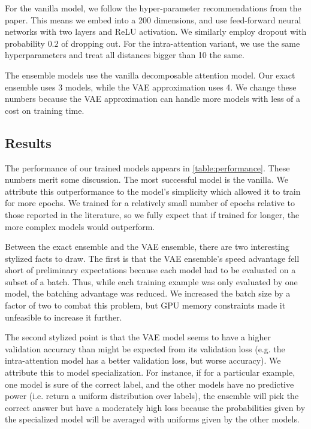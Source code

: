 \documentclass[12pt]{article}
\begin{document}
For the vanilla model, we follow the hyper-parameter recommendations from the
paper. This means we embed into a 200 dimensions, and use feed-forward neural
networks with two layers and ReLU activation. We similarly employ dropout with
probability $0.2$ of dropping out. For the intra-attention variant, we use the
same hyperparameters and treat all distances bigger than 10 the same.

The ensemble models use the vanilla decomposable attention model. Our exact
ensemble uses 3 models, while the VAE approximation uses 4. We change these
numbers because the VAE approximation can handle more models with less of a cost
on training time. 

\subsection{Results}

The performance of our trained models appears in \cref{table:performance}. These
numbers merit some discussion. The most successful model is the vanilla. We
attribute this outperformance to the model's simplicity which allowed it to
train for more epochs. We trained for a relatively small number of epochs
relative to those reported in the literature, so we fully expect that if trained
for longer, the more complex models would outperform.

Between the exact ensemble and the VAE ensemble, there are two interesting
stylized facts to draw. The first is that the VAE ensemble's speed advantage
fell short of preliminary expectations because each model had to be evaluated on
a subset of a batch. Thus, while each training example was only evaluated by one
model, the batching advantage was reduced. We increased the batch size by a
factor of two to combat this problem, but GPU memory constraints made it
unfeasible to increase it further.

The second stylized point is that the VAE model seems to have a higher
validation accuracy than might be expected from its validation loss (e.g. the
intra-attention model has a better validation loss, but worse accuracy). We
attribute this to model specialization. For instance, if for a particular
example, one model is sure of the correct label, and the other models have no
predictive power (i.e. return a uniform distribution over labels), the ensemble
will pick the correct answer but have a moderately high loss because the
probabilities given by the specialized model will be averaged with uniforms
given by the other models. 
\end{document}
